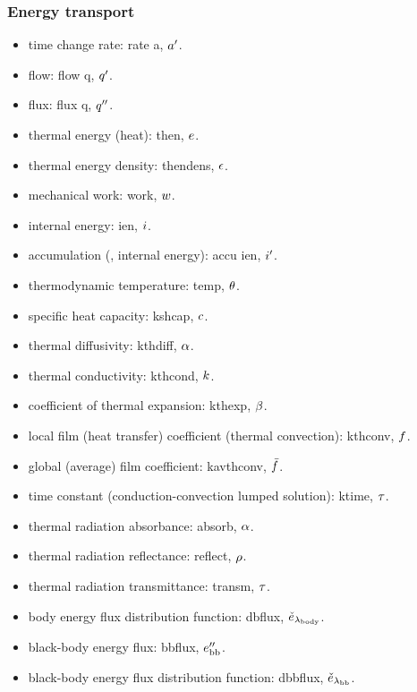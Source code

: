 \subsubsection{Energy transport}
\begin{itemize}
\item time change rate: rate a, ${a}^{\prime}$.
\item flow: flow q, ${q}^{\prime}$.
\item flux: flux q, ${q}^{\prime\prime}$.
\item thermal energy (heat): then, $e$.
\item thermal energy density: thendens, $\epsilon$.
\item mechanical work: work, $w$.
\item internal energy: ien, $i$.
\item accumulation (\eg, internal energy): accu ien, ${i}^{\prime}$.
\item thermodynamic temperature: temp, $\theta$.
\item specific heat capacity: kshcap, $c$.
\item thermal diffusivity: kthdiff, $\alpha$.
\item thermal conductivity: kthcond, $k$.
\item coefficient of thermal expansion: kthexp, $\beta$.
\item local film (heat transfer) coefficient (thermal convection): kthconv, $f$.
\item global (average) film coefficient: kavthconv, $\bar{f}$.
\item time constant (conduction-convection lumped solution): ktime, $\tau$.
\item thermal radiation absorbance: absorb, $\alpha$.
\item thermal radiation reflectance: reflect, $\rho$.
\item thermal radiation transmittance: transm, $\tau$.
\item body energy flux distribution function: dbflux, $\check{e}_{\lambda_\text{body}}$.
\item black-body energy flux: bbflux, ${e}^{\prime\prime}_\text{bb}$.
\item black-body energy flux distribution function: dbbflux, $\check{e}_{\lambda_\text{bb}}$.
\end{itemize}


